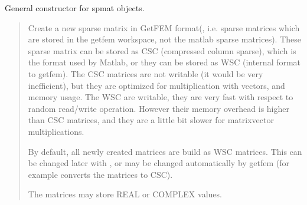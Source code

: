 \documentclass[a4paper,11pt,english]{sphinxmanual}
\begin{document}
General constructor for spmat objects.
\begin{quote}

Create a new sparse matrix in GetFEM format(, i.e. sparse
matrices which are stored in the getfem workspace, not the matlab sparse
matrices). These sparse matrix can be stored as CSC (compressed column
sparse), which is the format used by Matlab, or they can be stored as WSC
(internal format to getfem). The CSC matrices are not writable (it would
be very inefficient), but they are optimized for multiplication with
vectors, and memory usage. The WSC are writable, they are very fast with
respect to random read/write operation. However their memory overhead is
higher than CSC matrices, and they are a little bit slower for
matrix\sphinxhyphen{}vector multiplications.

By default, all newly created matrices are build as WSC matrices. This can
be changed later with , or may be changed
automatically by getfem (for example  converts the
matrices to CSC).

The matrices may store REAL or COMPLEX values.
\end{quote}
\end{document}
